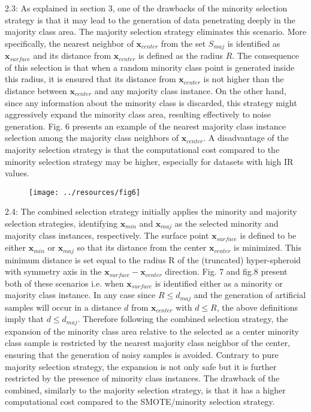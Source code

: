 \documentclass[parskip=full]{scrartcl}
\begin{document}
2.3: As explained in section 3, one of the drawbacks of the minority selection strategy is that it may lead to the generation of data penetrating deeply in the majority class area. The majority selection strategy eliminates this scenario. More specifically, the nearest neighbor of \( \textbf{x}_{center} \) from the set \( S_{maj} \) is identified as \( \textbf{x}_{surface} \) and its distance from \( \textbf{x}_{center} \) is defined as the radius \( R \). The consequence of this selection is that when a random minority class point is generated inside this radius, it is ensured that its distance from \( \textbf{x}_{center} \) is not higher than the distance between \( \textbf{x}_{center} \) and any majority class instance. On the other hand, since any information about the minority class is discarded, this strategy might aggressively expand the minority class area, resulting effectively to noise generation. Fig. 6 presents an example of the nearest majority class instance selection among the majority class neighbors of \( \textbf{x}_{center} \). A disadvantage of the majority selection strategy is that the computational cost compared to the minority selection strategy may be higher, especially for datasets with high IR values.

\begin{figure}[H]
	\centering
	\texttt{[image: ../resources/fig6]}
\end{figure}

2.4: The combined selection strategy initially applies the minority and majority selection strategies, identifying \( \textbf{x}_{min} \) and \( \textbf{x}_{maj} \) as the selected minority and majority class instances, respectively. The surface point \( \textbf{x}_{surface} \) is defined to be either \( \textbf{x}_{min} \) or \( \textbf{x}_{maj} \) so that its distance from the center \( \textbf{x}_{center} \) is minimized. This minimum distance is set equal to the radius R of the (truncated) hyper-spheroid with symmetry axis in the \( \textbf{x}_{surface} - \textbf{x}_{center} \) direction. Fig. 7 and fig.8 present both of these scenarios i.e. when \( \textbf{x}_{surface} \) is identified either as a minority or majority class instance. In any case since \( R \leq d_{maj} \) and the generation of artificial samples will occur in a distance \( d \) from \( \textbf{x}_{center} \) with \(d \leq R \), the above definitions imply that \( d \leq d_{maj} \). Therefore following the combined selection strategy, the expansion of the minority class area relative to the selected as a center minority class sample is restricted by the nearest majority class neighbor of the center, ensuring that the generation of noisy samples is avoided. Contrary to pure majority selection strategy, the expansion is not only safe but it is further restricted by the presence of minority class instances. The drawback of the combined, similarly to the majority selection strategy, is that it has a higher computational cost compared to the SMOTE/minority selection strategy.
\end{document}
